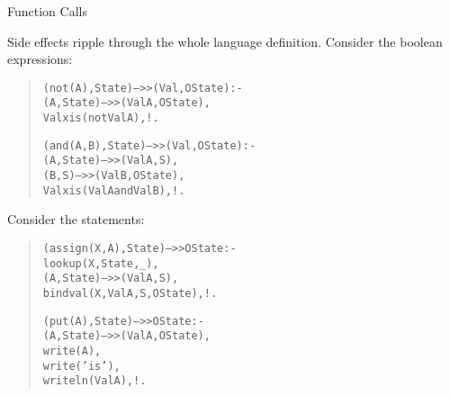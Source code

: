 \documentclass{beamer}
\begin{document}
\begin{frame}[fragile]{Function Calls}
\scriptsize

Side effects ripple through the whole language definition. Consider the boolean expressions:
\begin{quote}
\begin{alltt}\tiny
(not(A),State) -->> (Val,OState) :-      % not
    (A,State) -->> (ValA,OState),
    Val xis (not ValA),!.

(and(A,B),State) -->> (Val,OState) :-     % and
    (A,State) -->> (ValA,S),
    (B,S) -->> (ValB,OState),
    Val xis (ValA and ValB),!.
\end{alltt}
\end{quote}
Consider the statements:
\begin{quote}
\begin{alltt}\tiny
(assign(X,A),State) -->> OState :-     % assignment
    lookup(X,State,_),
    (A,State) -->> (ValA,S),               
    bindval(X,ValA,S,OState),!.    

(put(A),State) -->> OState :-           % writing
    (A,State) -->> (ValA,OState),
    write(A),
    write(' is '),
    writeln(ValA),!.  
\end{alltt}
\end{quote}

\end{frame}
\end{document}
